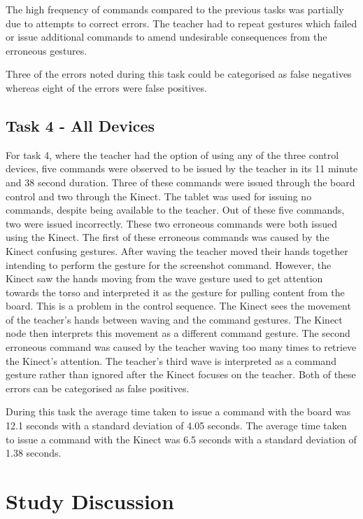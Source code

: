 \documentclass[manuscript, review, screen]{acmart}
\begin{document}
The high frequency of commands compared to the previous tasks was partially due to attempts to correct errors.
The teacher had to repeat gestures which failed or issue additional commands to amend undesirable consequences from the erroneous gestures.

Three of the errors noted during this task could be categorised as false negatives whereas eight of the errors were false positives.

\subsection{Task 4 - All Devices}
\label{sec:results:task4}  

For task 4, where the teacher had the option of using any of the three control devices, five commands were observed to be issued by the teacher in its 11 minute and 38 second duration.
Three of these commands were issued through the board control and two through the Kinect.
The tablet was used for issuing no commands, despite being available to the teacher.
Out of these five commands, two were issued incorrectly.
These two erroneous commands were both issued using the Kinect.
The first of these erroneous commands was caused by the Kinect confusing gestures.
After waving the teacher moved their hands together intending to perform the gesture for the screenshot command.
However, the Kinect saw the hands moving from the wave gesture used to get attention towards the torso and interpreted it as the gesture for pulling content from the board.
This is a problem in the control sequence.
The Kinect sees the movement of the teacher's hands between waving and the command gestures.
The Kinect node then interprets this movement as a different command gesture.
The second erroneous command was caused by the teacher waving too many times to retrieve the Kinect's attention.
The teacher's third wave is interpreted as a command gesture rather than ignored after the Kinect focuses on the teacher.
Both of these errors can be categorised as false positives.

During this task the average time taken to issue a command with the board was 12.1 seconds with a standard deviation of 4.05 seconds.
The average time taken to issue a command with the Kinect was 6.5 seconds with a standard deviation of 1.38 seconds.


\section{Study Discussion}
\label{sec:evaluationdiscussion}
\end{document}
